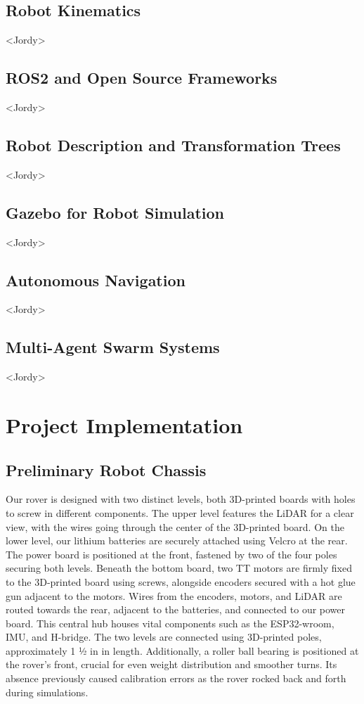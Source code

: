 \documentclass[conference]{IEEEtran}
\begin{document}
\subsection{Robot Kinematics} <Jordy>

\subsection{ROS2 and Open Source Frameworks} <Jordy>

\subsection{Robot Description and Transformation Trees} <Jordy>

\subsection{Gazebo for Robot Simulation} <Jordy>

\subsection{Autonomous Navigation} <Jordy>

\subsection{Multi-Agent Swarm Systems} <Jordy>

\section{Project Implementation}
\subsection{Preliminary Robot Chassis}

Our rover is designed with two distinct levels, both 3D-printed boards with holes to screw in different components. The upper level features the LiDAR for a clear view, with the wires going through the center of the 3D-printed board.
On the lower level, our lithium batteries are securely attached using Velcro at the rear. The power board is positioned at the front, fastened by two of the four poles securing both levels.
Beneath the bottom board,  two TT motors are firmly fixed to the 3D-printed board using screws, alongside encoders secured with a hot glue gun adjacent to the motors. Wires from the encoders, motors, and LiDAR are routed towards the rear, adjacent to the batteries, and connected to our power board. This central hub houses vital components such as the ESP32-wroom, IMU, and H-bridge.
The two levels are connected using 3D-printed poles, approximately 1 ½ in in length. Additionally, a roller ball bearing is positioned at the rover's front, crucial for even weight distribution and smoother turns. Its absence previously caused calibration errors as the rover rocked back and forth during simulations.
\end{document}
